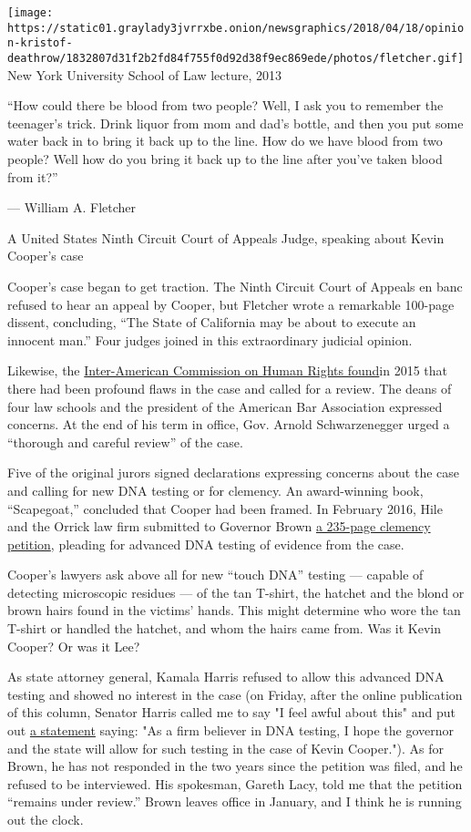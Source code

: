 \texttt{[image: https://static01.graylady3jvrrxbe.onion/newsgraphics/2018/04/18/opinion-kristof-deathrow/1832807d31f2b2fd84f755f0d92d38f9ec869ede/photos/fletcher.gif]}
New York University School of Law lecture, 2013

``How could there be blood from two people? Well, I ask you to remember
the teenager's trick. Drink liquor from mom and dad's bottle, and then
you put some water back in to bring it back up to the line. How do we
have blood from two people? Well how do you bring it back up to the line
after you've taken blood from it?''

--- William A. Fletcher

A United States Ninth Circuit Court of Appeals Judge, speaking about
Kevin Cooper's case

Cooper's case began to get traction. The Ninth Circuit Court of Appeals
en banc refused to hear an appeal by Cooper, but Fletcher wrote a
remarkable 100-page dissent, concluding, ``The State of California may
be about to execute an innocent man.'' Four judges joined in this
extraordinary judicial opinion.

Likewise, the
\href{https://kevincooperorg.files.wordpress.com/2017/01/iachr-report-no-26-15-dated-7-21-15.pdf}{Inter-American
Commission on Human Rights found}in 2015 that there had been profound
flaws in the case and called for a review. The deans of four law schools
and the president of the American Bar Association expressed concerns. At
the end of his term in office, Gov. Arnold Schwarzenegger urged a
``thorough and careful review'' of the case.

Five of the original jurors signed declarations expressing concerns
about the case and calling for new DNA testing or for clemency. An
award-winning book, ``Scapegoat,'' concluded that Cooper had been
framed. In February 2016, Hile and the Orrick law firm submitted to
Governor Brown
\href{https://kevincooperorg.files.wordpress.com/2017/02/kevin-cooper_s-petition-for-executive-clemency.pdf}{a
235-page clemency petition}, pleading for advanced DNA testing of
evidence from the case.

Cooper's lawyers ask above all for new ``touch DNA'' testing --- capable
of detecting microscopic residues --- of the tan T-shirt, the hatchet
and the blond or brown hairs found in the victims' hands. This might
determine who wore the tan T-shirt or handled the hatchet, and whom the
hairs came from. Was it Kevin Cooper? Or was it Lee?

As state attorney general, Kamala Harris refused to allow this advanced
DNA testing and showed no interest in the case (on Friday, after the
online publication of this column, Senator Harris called me to say "I
feel awful about this" and put out
\href{https://www.facebookcorewwwi.onion/KamalaHarris/posts/10156769408692923}{a
statement} saying: "As a firm believer in DNA testing, I hope the
governor and the state will allow for such testing in the case of Kevin
Cooper."). As for Brown, he has not responded in the two years since the
petition was filed, and he refused to be interviewed. His spokesman,
Gareth Lacy, told me that the petition ``remains under review.'' Brown
leaves office in January, and I think he is running out the clock.


